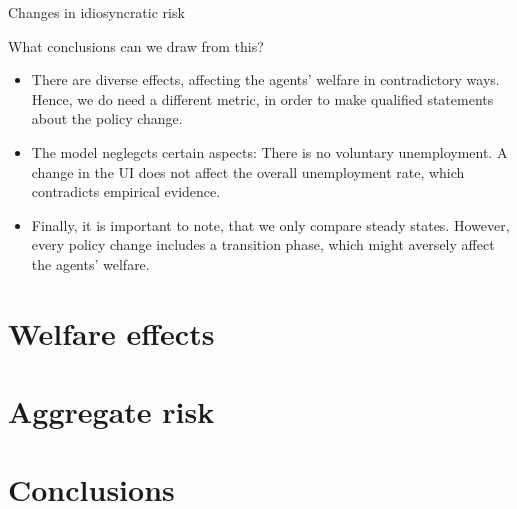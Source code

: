 \documentclass{beamer}
\begin{document}
\begin{frame}{Changes in idiosyncratic risk}
	
What conclusions can we draw from this?  

	\begin{itemize}
	\item {
There are diverse effects, affecting the agents' welfare in contradictory ways. Hence, we do need a different metric, in order to make qualified statements about the policy change. 
	}	
	\item {
The model neglegcts certain aspects: There is no voluntary unemployment. A change in the UI does not affect the overall unemployment rate, which contradicts empirical evidence. 
	}	
	\item {
Finally, it is important to note, that we only compare steady states. However, every policy change includes a transition phase, which might aversely affect the agents' welfare. 
	}	


	\end{itemize} 
\end{frame}


\section{Welfare effects}
\subsection{}


\section{Aggregate risk}
\subsection{}

\section{Conclusions}
\subsection{}
\end{document}
